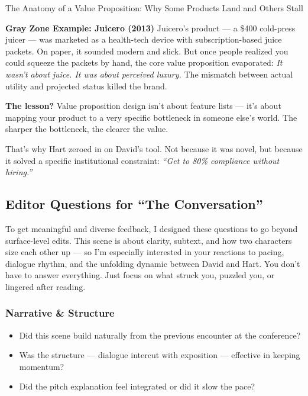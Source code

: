 \begin{HistoricalSidebar}{The Anatomy of a Value Proposition: Why Some Products Land and Others Stall}
  \medskip
  
  \textbf{Gray Zone Example: Juicero (2013)}  
  Juicero’s product — a \$400 cold-press juicer — was marketed as a health-tech device with subscription-based juice packets. 
  On paper, it sounded modern and slick. But once people realized you could squeeze the packets by hand, the core value 
  proposition evaporated:  
  \textit{It wasn't about juice. It was about perceived luxury.}  
  The mismatch between actual utility and projected status killed the brand.
  
  \medskip
  
  \textbf{The lesson?}  
  Value proposition design isn’t about feature lists — it’s about mapping your product to a very specific bottleneck in someone 
  else’s world. The sharper the bottleneck, the clearer the value.
  
  \medskip
  
  That’s why Hart zeroed in on David’s tool. Not because it was novel, but because it solved a specific institutional constraint:  
  \textit{“Get to 80\% compliance without hiring.”}
  
\end{HistoricalSidebar}


\subsection{Editor Questions for ``The Conversation''}

To get meaningful and diverse feedback, I designed these questions to go beyond surface-level edits.  
This scene is about clarity, subtext, and how two characters size each other up — so I’m especially interested in your reactions to pacing, dialogue rhythm, and the unfolding dynamic between David and Hart. You don’t have to answer everything. Just focus on what struck you, puzzled you, or lingered after reading.

\subsubsection{Narrative \& Structure}

\begin{itemize}
  \item Did this scene build naturally from the previous encounter at the conference?
  \item Was the structure — dialogue intercut with exposition — effective in keeping momentum?
  \item Did the pitch explanation feel integrated or did it slow the pace?
\end{itemize}

